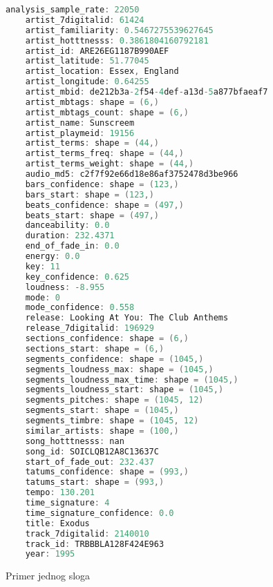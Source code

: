 \begin{figure}[H]
\lstset{style=mystyle}
\begin{lstlisting}[language=C, basicstyle=\footnotesize]
    analysis_sample_rate: 22050
    artist_7digitalid: 61424
    artist_familiarity: 0.5467275539627645
    artist_hotttnesss: 0.3861804160792181
    artist_id: ARE26EG1187B990AEF
    artist_latitude: 51.77045
    artist_location: Essex, England
    artist_longitude: 0.64255
    artist_mbid: de212b3a-2f54-4def-a13d-5a877bfaeaf7
    artist_mbtags: shape = (6,)
    artist_mbtags_count: shape = (6,)
    artist_name: Sunscreem
    artist_playmeid: 19156
    artist_terms: shape = (44,)
    artist_terms_freq: shape = (44,)
    artist_terms_weight: shape = (44,)
    audio_md5: c2f7f92e66d18e86af3752478d3be966
    bars_confidence: shape = (123,)
    bars_start: shape = (123,)
    beats_confidence: shape = (497,)
    beats_start: shape = (497,)
    danceability: 0.0
    duration: 232.4371
    end_of_fade_in: 0.0
    energy: 0.0
    key: 11
    key_confidence: 0.625
    loudness: -8.955
    mode: 0
    mode_confidence: 0.558
    release: Looking At You: The Club Anthems
    release_7digitalid: 196929
    sections_confidence: shape = (6,)
    sections_start: shape = (6,)
    segments_confidence: shape = (1045,)
    segments_loudness_max: shape = (1045,)
    segments_loudness_max_time: shape = (1045,)
    segments_loudness_start: shape = (1045,)
    segments_pitches: shape = (1045, 12)
    segments_start: shape = (1045,)
    segments_timbre: shape = (1045, 12)
    similar_artists: shape = (100,)
    song_hotttnesss: nan
    song_id: SOICLQB12A8C13637C
    start_of_fade_out: 232.437
    tatums_confidence: shape = (993,)
    tatums_start: shape = (993,)
    tempo: 130.201
    time_signature: 4
    time_signature_confidence: 0.0
    title: Exodus
    track_7digitalid: 2140010
    track_id: TRBBBLA128F424E963
    year: 1995
\end{lstlisting}
\label{primer:Song}
\caption{Primer jednog sloga}
\end{figure}
